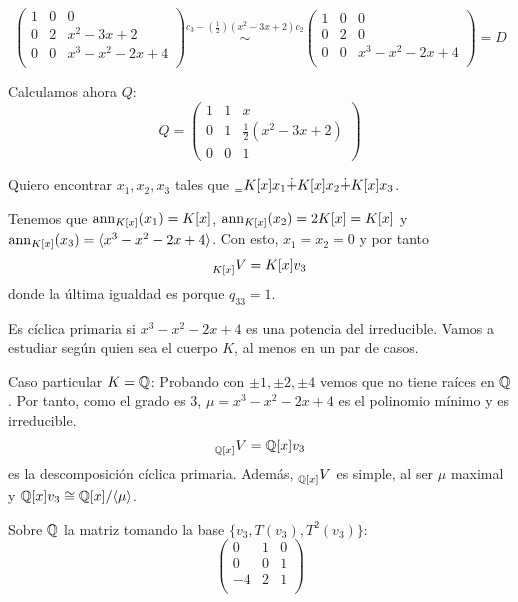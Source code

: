 \[
  \begin{pmatrix}
    1   & 0   &  0  \\
    0   & 2    & x^2-3x+2  \\
    0   & 0    & x^3-x^2-2x+4  \\
  \end{pmatrix}
  \overset{c_3-(\frac{1}{2})(x^2-3x+2)c_2}{\sim}
  \begin{pmatrix}
    1   & 0   &  0  \\
    0   & 2    & 0\\
    0   & 0    & x^3-x^2-2x+4  \\
  \end{pmatrix} = D
\]

Calculamos ahora \(Q\):
\[
  Q=
  \begin{pmatrix}
    1 & 1 & x\\
    0 & 1 & \frac{1}{2}(x^2-3x+2)\\
    0 & 0 & 1
  \end{pmatrix}
\]

Quiero encontrar \(x_1, x_2, x_3\) tales que
\(\prescript{}{=}{K}[x]x_1\dot{+}K[x]x_2\dot{+}K[x]x_3\).

Tenemos que \(\operatorname{ann}_{K[x]}(x_1)=K[x]\), \(\operatorname{ann}_{K[x]}(x_2)=2K[x]=K[x]\) y
\(\operatorname{ann}_{K[x]}(x_3)=\langle x^3-x^2-2x+4 \rangle\).
Con esto, \(x_1=x_2=0\) y por tanto
\[
  \prescript{}{K[x]}{V}=K[x]v_3
\]
donde la última igualdad es porque \(q_{33}=1\).

Es cíclica primaria si \( x^3-x^2-2x+4 \) es una potencia del irreducible.
Vamos a estudiar según quien sea el cuerpo \(K\), al menos en un par de
casos.

Caso particular \(K=\mathbb{Q}\): Probando con \(\pm 1, \pm 2, \pm 4\) vemos que
no tiene raíces en \(\mathbb{Q}\). Por tanto, como el grado es 3,
\(\mu= x^3-x^2-2x+4\) es el polinomio mínimo y es irreducible.
\[
  \prescript{}{\mathbb{Q}[x]}{V}=\mathbb{Q}[x]v_3
\]
es la descomposición cíclica primaria. Además, \(\prescript{}{\mathbb{Q}[x]}{V}\)
es simple, al ser \(\mu\) maximal y \(\mathbb{Q}[x]v_3\cong \mathbb{Q}[x]/\langle\mu\rangle\).

Sobre \(\mathbb{Q}\) la matriz tomando la base \(\{v_3,T(v_3),T^2(v_3)\}\):              
\[  \begin{pmatrix}                                                                
       0 & 1 & 0\\                                                                 
       0 & 0 & 1\\                                                                  
       -4 & 2 & 1\\                                                                 
     \end{pmatrix}                                                                  
   \]        

